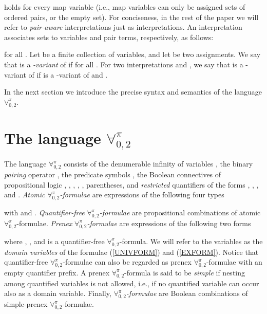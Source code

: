 \documentclass[submission,copyright,creativecommons]{eptcs}
\newcommand{\Lang}{\ensuremath{\mathbf{\forall}^{\pi}_{0,2}}\xspace}
\begin{document}
holds for every map variable  (i.e., map variables
can only be assigned sets of ordered pairs, or the empty set).  For
conciseness, in the rest of the paper we will refer to \emph{pair-aware}
interpretations just as interpretations.
An interpretation  associates sets to
variables and pair terms, respectively, as follows:

for all . 
Let  be a finite collection of variables, and let
 be two assignments.  We say that  is a \emph{-variant}
of  if  for all .  For two
interpretations  and , we say that  is a -variant of
 if  is a -variant of  and
.

In the next section we introduce the precise syntax and semantics of 
the language \Lang.

\section{The language \Lang}\label{LANG}

The language \Lang consists of the denumerable infinity of variables
, the binary \emph{pairing} operator
, the predicate symbols , the Boolean
connectives of propositional logic , , ,
, , parentheses, and \emph{restricted}
quantifiers of the forms , ,
, and .
\emph{Atomic} \Lang\emph{-formulae} are expressions of
the following four types

with  and .
\emph{Quantifier-free} \Lang\emph{-formulae} are propositional
combinations of atomic \Lang-formulae. 
\emph{Prenex} \Lang\emph{-formulae} are expressions of the 
following two forms

where , ,
and  is a quantifier-free \Lang-formula.  We will refer to the
variables  as the \emph{domain variables} of
the formulae (\ref{UNIVFORM}) and (\ref{EXFORM}).  Notice that
quantifier-free \Lang-formulae can also be regarded as prenex
\Lang-formulae with an empty quantifier prefix.
A prenex \Lang-formula is said to be \emph{simple} if nesting among
quantified variables is not allowed, i.e., if no quantified variable
can occur also as a domain variable.
Finally, \Lang\emph{-formulae} are Boolean combinations of
simple-prenex \Lang-formulae.
\end{document}
